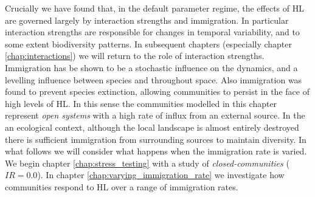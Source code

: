 Crucially we have found that, in the default parameter regime, the effects of HL are governed largely by interaction strengths and immigration. In particular interaction strengths are responsible for changes in temporal variability, and to some extent biodiversity patterns. In subsequent chapters (especially chapter \ref{chap:interactions}) we will return to the role of interaction strengths. Immigration has be shown to be a stochastic influence on the dynamics, and a levelling influence between species and throughout space. Also immigration was found to prevent species extinction, allowing communities to persist in the face of high levels of HL. In this sense the communities modelled in this chapter represent \emph{open systems} with a high rate of influx from an external source. In the an ecological context, although the local landscape is almost entirely destroyed there is sufficient immigration from surrounding sources to maintain diversity. In what follows we will consider what happens when the immigration rate is varied. We begin chapter \ref{chap:stress_testing} with a study of \emph{closed-communities} ($IR=0.0$). In chapter \ref{chap:varying_immigration_rate} we investigate how communities respond to HL over a range of immigration rates. 
   




%	
%	
%	
%	
%	
%	

